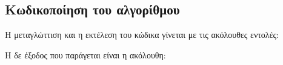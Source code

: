 \subsection{Κωδικοποίηση του αλγορίθμου}






Η μεταγλώττιση και η εκτέλεση του κώδικα γίνεται με τις ακόλουθες εντολές:



Η δε έξοδος που παράγεται είναι η ακόλουθη:



%
%


%
